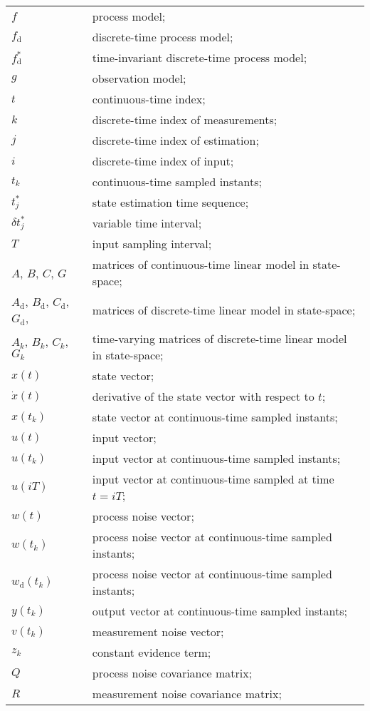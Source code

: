 \begin{longtable}{ll}
	$f$						& process model; \\
	$f_{\textrm{d}}$		& discrete-time process model; \\
	$f^*_\textrm{d}$		& time-invariant discrete-time process model; \\
	$g$						& observation model; \\
	$t$						& continuous-time index; \\
	$k$						& discrete-time index of measurements; \\
	$j$						& discrete-time index of estimation; \\
	$i$						& discrete-time index of input; \\
	$t_k$					& continuous-time sampled instants; \\
	$t^*_j$					& state estimation time sequence; \\
	$\delta t^*_j$			& variable time interval; \\
	$T$						& input sampling interval; \\
	
	$A$, $B$, $C$, $G$		& matrices of continuous-time linear model in state-space;  \\
	$A_{\textrm{d}}$,
	$B_{\textrm{d}}$,
	$C_{\textrm{d}}$,
	$G_{\textrm{d}}$,		& matrices of discrete-time linear model in state-space;  \\
	
	$A_k$, $B_k$, $C_k$, $G_k$		& time-varying matrices of discrete-time linear model in state-space;  \\
	
	$x(t)$					& state vector; \\
	$\dot{x}(t)$			& derivative of the state vector with respect to $t$; \\
	$x(t_k)$				& state vector at continuous-time sampled instants; \\
	$u(t)$					& input vector; \\
	$u(t_k)$				& input vector at continuous-time sampled instants; \\
	$u(iT)$					& input vector at continuous-time sampled at time $t = iT$; \\						
	$w(t)$					& process noise vector; \\
	$w(t_k)$				& process noise vector at continuous-time sampled instants; \\
	$w_{\textrm{d}}(t_k)$				& process noise vector at continuous-time sampled instants; \\
	$y(t_k)$            	& output vector at continuous-time sampled instants;\\
	$v(t_k)$				& measurement noise vector; \\
	$z_k$					& constant evidence term; \\
	$Q$						& process noise covariance matrix; \\
	$R$						& measurement noise covariance matrix; \\
	

\end{longtable}

